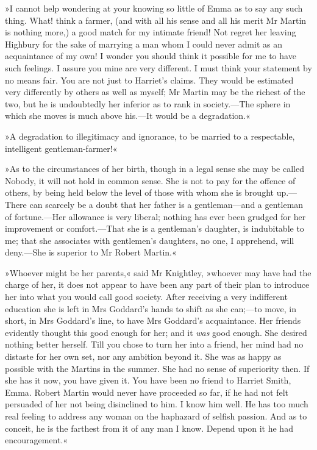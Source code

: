 »I cannot help wondering at your knowing so little of Emma as to say any such thing. What! think a farmer, (and with all his sense and all his merit Mr Martin is nothing more,) a good match for my intimate friend! Not regret her leaving Highbury for the sake of marrying a man whom I could never admit as an acquaintance of my own! I wonder you should think it possible for me to have such feelings. I assure you mine are very different. I must think your statement by no means fair. You are not just to Harriet's claims. They would be estimated very differently by others as well as myself; Mr Martin may be the richest of the two, but he is undoubtedly her inferior as to rank in society.—The sphere in which she moves is much above his.—It would be a degradation.«

»A degradation to illegitimacy and ignorance, to be married to a respectable, intelligent gentleman-farmer!«

»As to the circumstances of her birth, though in a legal sense she may be called Nobody, it will not hold in common sense. She is not to pay for the offence of others, by being held below the level of those with whom she is brought up.—There can scarcely be a doubt that her father is a gentleman—and a gentleman of fortune.—Her allowance is very liberal; nothing has ever been grudged for her improvement or comfort.—That she is a gentleman's daughter, is indubitable to me; that she associates with gentlemen's daughters, no one, I apprehend, will deny.—She is superior to Mr Robert Martin.«

»Whoever might be her parents,« said Mr Knightley, »whoever may have had the charge of her, it does not appear to have been any part of their plan to introduce her into what you would call good society. After receiving a very indifferent education she is left in Mrs Goddard's hands to shift as she can;—to move, in short, in Mrs Goddard's line, to have Mrs Goddard's acquaintance. Her friends evidently thought this good enough for her; and it \textit{was} good enough. She desired nothing better herself. Till you chose to turn her into a friend, her mind had no distaste for her own set, nor any ambition beyond it. She was as happy as possible with the Martins in the summer. She had no sense of superiority then. If she has it now, you have given it. You have been no friend to Harriet Smith, Emma. Robert Martin would never have proceeded so far, if he had not felt persuaded of her not being disinclined to him. I know him well. He has too much real feeling to address any woman on the haphazard of selfish passion. And as to conceit, he is the farthest from it of any man I know. Depend upon it he had encouragement.«

